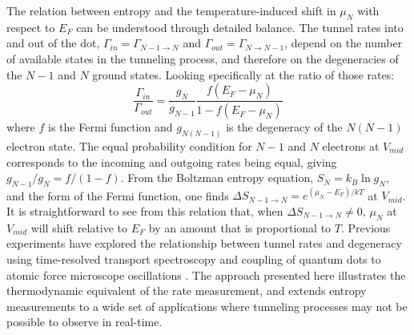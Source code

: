 \documentclass[twocolumn,showpacs,amsmath,amssymb,prl,aps,superscriptaddress]{revtex4-1}
\begin{document}
The relation between entropy and the temperature-induced shift in $\mu_{N}$ with respect to $E_F$ can be understood through detailed balance.  The tunnel rates into and out of the dot, $\Gamma_{in}=\Gamma_{N-1\rightarrow N}$ and $\Gamma_{out}=\Gamma_{N\rightarrow N-1}$, depend on the number of available states in the tunneling process, and therefore on the degeneracies of the $N-1$ and $N$ ground states\cite{Beenakker1991, Gustavsson2009}.  Looking specifically at the ratio of those rates: 
%
\begin{equation}
	\frac{\Gamma_{in}}{\Gamma_{out}} =  \frac{g_{N}}{g_{N-1}} \frac{f(E_F - \mu_{N})}{1-f(E_F - \mu_{N})} \label{eqn:rates}
\end{equation}
%
where $f$ is the Fermi function and $g_{N(N-1)}$ is the degeneracy of the $N(N-1)$ electron state.  The equal probability condition for $N-1$ and $N$ electrons at $V_{mid}$ corresponds to the incoming and outgoing rates being equal, giving $g_{N-1}/g_{N}=f/(1-f)$. From the Boltzman entropy equation, $S_{N}=k_{B} \ln{g_N}$, and the form of the Fermi function, one finds $\Delta S_{N-1\rightarrow N}=e^{(\mu_{N}-E_F)/kT}$ at $V_{mid}$. It is straightforward to see from this relation that, when $\Delta S_{N-1\rightarrow N} \neq 0$, $\mu_N$ at $V_{mid}$ will shift relative to $E_F$ by an amount that is proportional to $T$. Previous experiments have explored the relationship between tunnel rates and degeneracy using time-resolved transport spectroscopy and coupling of quantum dots to atomic force microscope oscillations \cite{Cockins2010, Bennett2010, Beckel2014, Hofmann2016}. The approach presented here illustrates the thermodynamic equivalent of the rate measurement, and extends entropy measurements to a wide set of applications where tunneling processes may not be possible to observe in real-time.
\end{document}
